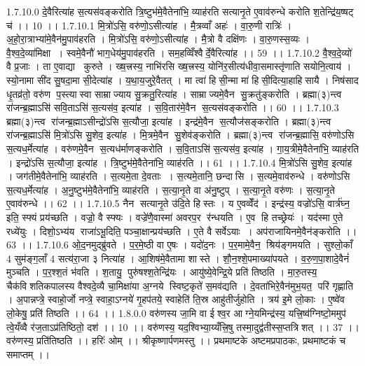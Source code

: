 1.7.10.0
दे॒वैरित्या॑ह स॒त्यस॑वङ्करोति त्रि॒ष्टुभ॑मे॒वैतेना॑भि॒ व्याह॑रति सत्यानृ॒ते ए॒वाव॑रुन्धे करोति श॒तेन्द्रि॑य॒ष्षट् च॑ ।। 10 ।।
1.7.10.1
मि॒त्रो॑ऽसि॒ वरु॑णो॒ऽसीत्या॑ह । मै॒त्रव्वाँ अहः॑ । वा॒रु॒णी रात्रिः॑ । अ॒हो॒रा॒त्राभ्या॑मे॒वैन॑मु॒पाव॑हरति । मि॒त्रो॑ऽसि॒ वरु॑णो॒ऽसीत्या॑ह । मै॒त्रो वै दक्षि॑णः । वा॒रु॒णस्स॒व्यः । वै॒श्व॒दे॒व्या॑मिक्षा । स्वमे॒वैनौ॑ भाग॒धेय॑मु॒पाव॑हरति । सम॒हव्विँश्वैर्दे॒वैरित्या॑ह ।। 59 ।।
1.7.10.2
वै॒श्व॒दे॒व्यो॑ वै प्र॒जाः । ता ए॒वाद्या कुरुते । ख्ष॒त्त्रस्य॒ नाभि॑रसि ख्ष॒त्त्रस्य॒ योनि॑र॒सीत्य॑धीवा॒समास्तृ॑णाति सयोनि॒त्वाय॑ । स्यो॒नामा सी॑द सु॒षदा॒मा सी॒देत्या॑ह । य॒था॒य॒जुरे॒वैतत् । मा त्वा॑ हिसी॒न्मा मा॑ हिसी॒दित्या॒हाहि॑सायै । निष॑साद धृ॒तव्र॑तो॒ वरु॑ण प॒स्त्यास्वा साम्राज्याय सु॒क्रतु॒रित्या॑ह । साम्राज्यमे॒वैन॑ सु॒क्रतु॑ङ्करोति । ब्रह्मा(३)न्त्व रा॑जन्ब्र॒ह्माऽसि॑ सवि॒ताऽसि॑ स॒त्यस॑व॒ इत्या॑ह । स॒वि॒तार॑मे॒वैन॑ स॒त्यस॑वङ्करोति ।। 60 ।।
1.7.10.3
ब्रह्मा(३)न्त्व रा॑जन्ब्र॒ह्माऽसीन्द्रो॑ऽसि स॒त्यौजा॒ इत्या॑ह । इन्द्र॑मे॒वैन॑ स॒त्यौज॑सङ्करोति । ब्रह्मा(३)न्त्व रा॑जन्ब्र॒ह्माऽसि॑ मि॒त्रो॑ऽसि सु॒शेव॒ इत्या॑ह । मि॒त्रमे॒वैन॑ सु॒शेव॑ङ्करोति । ब्रह्मा(३)न्त्व रा॑जन्ब्र॒ह्मासि॒ वरु॑णोऽसि स॒त्यध॒र्मेत्या॑ह । वरु॑णमे॒वैन॑ स॒त्यध॑र्माणङ्करोति । स॒वि॒ताऽसि॑ स॒त्यस॑व॒ इत्या॑ह । गा॒य॒त्रीमे॒वैतेना॑भि॒ व्याह॑रति । इन्द्रो॑ऽसि स॒त्यौजा॒ इत्या॑ह । त्रि॒ष्टुभ॑मे॒वैतेना॑भि॒ व्याह॑रति ।। 61 ।।
1.7.10.4
मि॒त्रो॑ऽसि सु॒शेव॒ इत्या॑ह । जग॑तीमे॒वैतेना॑भि॒ व्याह॑रति । स॒त्यमे॒ता दे॒वताः । स॒त्यमे॒तानि॒ छन्दा॑सि । स॒त्यमे॒वाव॑रुन्धे । वरु॑णोऽसि स॒त्यध॒र्मेत्या॑ह । अ॒नु॒ष्टुभ॑मे॒वैतेना॑भि॒ व्याह॑रति । स॒त्या॒नृ॒ते वा अ॑नु॒ष्टुप् । स॒त्या॒नृ॒ते वरु॑णः । स॒त्या॒नृ॒ते ए॒वाव॑रुन्धे ।। 62 ।।
1.7.10.5
नैन॑ सत्यानृ॒ते उ॑दि॒ते हि॑स्तः । य ए॒वव्वेँद॑ । इन्द्र॑स्य॒ वज्रो॑ऽसि॒ वार्त्र॑घ्न॒ इति॒ स्फ्यं प्रय॑च्छति । वज्रो॒ वै स्फ्यः । वज्रे॑णै॒वास्मा॑ अवरप॒र र॑न्धयति । ए॒व हि तच्छ्रेयः॑ । यद॑स्मा ए॒ते रध्ये॑युः । दिशो॒ऽभ्य॑य राजा॑ऽभू॒दिति॒ पञ्चा॒क्षान्प्रय॑च्छति । ए॒ते वै सर्वेऽयाः । अप॑राजायिनमे॒वैन॑ङ्करोति ।। 63 ।।
1.7.10.6
ओ॒द॒नमुद्ब्रु॑वते । प॒र॒मे॒ष्ठी वा ए॒षः । यदो॑द॒नः । प॒र॒मामे॒वैन॒॒ श्रिय॑ङ्गमयति । सुश्लो॒काँ 4 सुम॑ङ्ग॒लाँ 4 सत्य॑रा॒जा ३ नित्या॑ह । आ॒शिष॑मे॒वैतामा शास्ते । शौ॒न॒श्शे॒पमाख्या॑पयते । व॒रु॒ण॒पा॒शादे॒वैनं॑ मुञ्चति । प॒र॒श्श॒तं भ॑वति । श॒तायु॒ पुरु॑षश्श॒तेन्द्रि॑यः । आयु॑ष्ये॒वेन्द्रि॒ये प्रति॑ तिष्ठति । मा॒रु॒तस्य॒ चैक॑विशतिकपालस्य वैश्वदे॒व्यै चा॒मिक्षा॑या अ॒ग्नये स्विष्ट॒कृते॑ स॒मव॑द्यति । दे॒वता॑भिरे॒वैन॑मुभ॒यत॒ परि॑ गृह्णाति । अ॒पान्नप्त्रे॒ स्वाहो॒र्जो नप्त्रे॒ स्वाहा॒ऽग्नये॑ गृ॒हप॑तये॒ स्वाहेति॑ ति॒स्र आहु॑तीर्जुहोति । त्रय॑ इ॒मे लो॒काः । ए॒ष्वे॑व लो॒केषु॒ प्रति॑ तिष्ठति ।। 64 ।।
1.8.0.0
वरु॑णस्य जा॒मि वा ईश्व॒र आग्ने॒यमिन्द्र॑स्य॒ यत्त्रि॒ष्व॑ग्निष्टो॒ममुप॑ त्वे॒यँव्वै र॑ज॒ताऽप्र॑तिष्ठितो॒ दश॑ ।। 10 ।। वरु॑णस्य॒ यद॒श्विभ्या॒य्यँत्त्रि॒षु तस्मा॒दुद्व॑तीस्स॒प्तत्रि॑शत् ।। 37 ।। वरु॑णस्य॒ प्रति॑तिष्ठति ।। हरिः॑ ओम् ।। श्रीकृष्णार्पणमस्तु ।। प्रथमाष्टके अष्टमप्रपाठकः, प्रथमाष्टकं च समाप्तम् ।।

